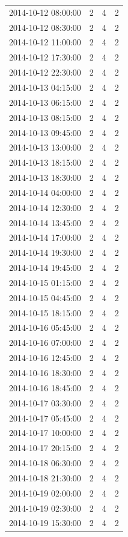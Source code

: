 \begin{tabular}{lrrr}
2014-10-12 08:00:00 & 2 & 4 & 2 \\
2014-10-12 08:30:00 & 2 & 4 & 2 \\
2014-10-12 11:00:00 & 2 & 4 & 2 \\
2014-10-12 17:30:00 & 2 & 4 & 2 \\
2014-10-12 22:30:00 & 2 & 4 & 2 \\
2014-10-13 04:15:00 & 2 & 4 & 2 \\
2014-10-13 06:15:00 & 2 & 4 & 2 \\
2014-10-13 08:15:00 & 2 & 4 & 2 \\
2014-10-13 09:45:00 & 2 & 4 & 2 \\
2014-10-13 13:00:00 & 2 & 4 & 2 \\
2014-10-13 18:15:00 & 2 & 4 & 2 \\
2014-10-13 18:30:00 & 2 & 4 & 2 \\
2014-10-14 04:00:00 & 2 & 4 & 2 \\
2014-10-14 12:30:00 & 2 & 4 & 2 \\
2014-10-14 13:45:00 & 2 & 4 & 2 \\
2014-10-14 17:00:00 & 2 & 4 & 2 \\
2014-10-14 19:30:00 & 2 & 4 & 2 \\
2014-10-14 19:45:00 & 2 & 4 & 2 \\
2014-10-15 01:15:00 & 2 & 4 & 2 \\
2014-10-15 04:45:00 & 2 & 4 & 2 \\
2014-10-15 18:15:00 & 2 & 4 & 2 \\
2014-10-16 05:45:00 & 2 & 4 & 2 \\
2014-10-16 07:00:00 & 2 & 4 & 2 \\
2014-10-16 12:45:00 & 2 & 4 & 2 \\
2014-10-16 18:30:00 & 2 & 4 & 2 \\
2014-10-16 18:45:00 & 2 & 4 & 2 \\
2014-10-17 03:30:00 & 2 & 4 & 2 \\
2014-10-17 05:45:00 & 2 & 4 & 2 \\
2014-10-17 10:00:00 & 2 & 4 & 2 \\
2014-10-17 20:15:00 & 2 & 4 & 2 \\
2014-10-18 06:30:00 & 2 & 4 & 2 \\
2014-10-18 21:30:00 & 2 & 4 & 2 \\
2014-10-19 02:00:00 & 2 & 4 & 2 \\
2014-10-19 02:30:00 & 2 & 4 & 2 \\
2014-10-19 15:30:00 & 2 & 4 & 2 \\

\end{tabular}
